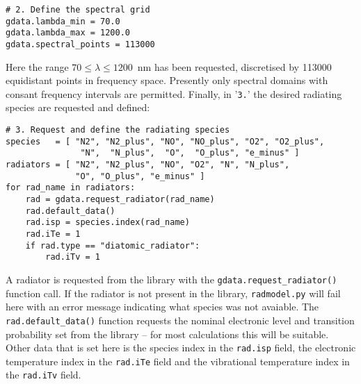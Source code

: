 \begin{lstlisting}[basicstyle=\ttfamily\small]
# 2. Define the spectral grid
gdata.lambda_min = 70.0
gdata.lambda_max = 1200.0
gdata.spectral_points = 113000
\end{lstlisting}

\noindent Here the range $70 \leq \lambda \leq 1200$~nm has been requested, discretised by 113000 equidistant points in frequency space.
Presently only spectral domains with consant frequency intervals are permitted.
Finally, in '\texttt{3.}' the desired radiating species are requested and defined:

\begin{lstlisting}[basicstyle=\ttfamily\small]
# 3. Request and define the radiating species
species   = [ "N2", "N2_plus", "NO", "NO_plus", "O2", "O2_plus",
               "N",  "N_plus",  "O",  "O_plus", "e_minus" ]
radiators = [ "N2", "N2_plus", "NO", "O2", "N", "N_plus",
              "O", "O_plus", "e_minus" ]
for rad_name in radiators:
    rad = gdata.request_radiator(rad_name)
    rad.default_data()
    rad.isp = species.index(rad_name)
    rad.iTe = 1
    if rad.type == "diatomic_radiator":
        rad.iTv = 1
\end{lstlisting}

A radiator is requested from the library with the \texttt{gdata.request\_radiator()} function call.
If the radiator is not present in the library, \texttt{radmodel.py} will fail here with an error message indicating what species was not avaiable.  
The \texttt{rad.default\_data()} function requests the nominal electronic level and transition probability set from the library -- for most calculations this will be suitable.
Other data that is set here is the species index in the \texttt{rad.isp} field, the electronic temperature index in the \texttt{rad.iTe} field and the vibrational temperature index in the \texttt{rad.iTv} field.  
